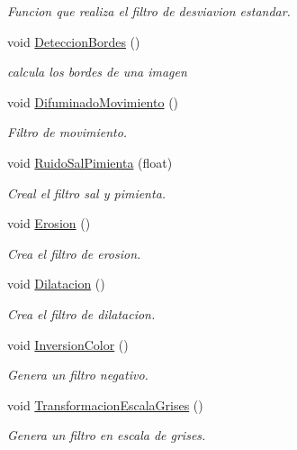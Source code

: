\begin{DoxyCompactItemize}
\begin{DoxyCompactList}\small\item\em Funcion que realiza el filtro de desviavion estandar. \end{DoxyCompactList}\item 
void \hyperlink{class_filtros_a9bed709d7363047dc9ec1449c4dd00b4}{Deteccion\+Bordes} ()
\begin{DoxyCompactList}\small\item\em calcula los bordes de una imagen \end{DoxyCompactList}\item 
void \hyperlink{class_filtros_a5826f19a9932e321c29fd1efa9c70e4d}{Difuminado\+Movimiento} ()
\begin{DoxyCompactList}\small\item\em Filtro de movimiento. \end{DoxyCompactList}\item 
void \hyperlink{class_filtros_a2ad4f5b18c537599bc171b9799683b1a}{Ruido\+Sal\+Pimienta} (float)
\begin{DoxyCompactList}\small\item\em Creal el filtro sal y pimienta. \end{DoxyCompactList}\item 
void \hyperlink{class_filtros_a8f604a50556e0e06e707cee8055522d1}{Erosion} ()
\begin{DoxyCompactList}\small\item\em Crea el filtro de erosion. \end{DoxyCompactList}\item 
void \hyperlink{class_filtros_a6b296610ee0b6f782d9be9f8c4ad25c2}{Dilatacion} ()
\begin{DoxyCompactList}\small\item\em Crea el filtro de dilatacion. \end{DoxyCompactList}\item 
void \hyperlink{class_filtros_a729e3fca9fd6ab3d39c3ae579ab26737}{Inversion\+Color} ()
\begin{DoxyCompactList}\small\item\em Genera un filtro negativo. \end{DoxyCompactList}\item 
void \hyperlink{class_filtros_a19ec703cb72322ef5cb7a38aa7de5c7b}{Transformacion\+Escala\+Grises} ()
\begin{DoxyCompactList}\small\item\em Genera un filtro en escala de grises. \end{DoxyCompactList}\item 

\end{DoxyCompactItemize}
